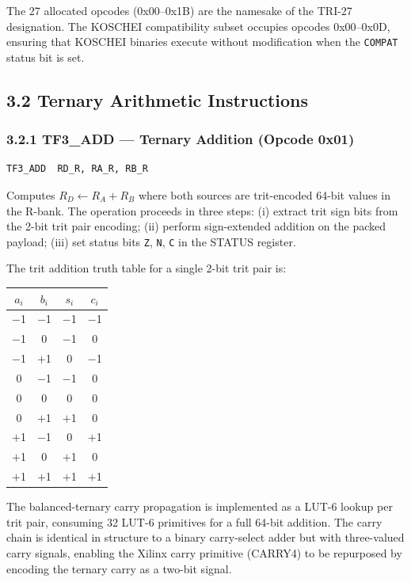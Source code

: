 The 27 allocated opcodes (0x00--0x1B) are the namesake of the
TRI-27 designation. The KOSCHEI compatibility subset occupies
opcodes 0x00--0x0D, ensuring that KOSCHEI binaries execute
without modification when the \texttt{COMPAT} status bit is set.

\subsection{3.2 Ternary Arithmetic Instructions}\label{fa_71:ternary-arithmetic}

\subsubsection{3.2.1 TF3\_ADD --- Ternary Addition (Opcode 0x01)}

\begin{verbatim}
TF3_ADD  RD_R, RA_R, RB_R
\end{verbatim}

Computes \(R_D \leftarrow R_A + R_B\) where both sources are
trit-encoded 64-bit values in the R-bank. The operation proceeds
in three steps: (i) extract trit sign bits from the 2-bit trit
pair encoding; (ii) perform sign-extended addition on the packed
payload; (iii) set status bits \texttt{Z}, \texttt{N}, \texttt{C}
in the STATUS register.

The trit addition truth table for a single 2-bit trit pair is:

\begin{longtable}[]{@{}cccc@{}}
\toprule\noalign{}
\(a_i\) & \(b_i\) & \(s_i\) & \(c_i\) \\
\midrule\noalign{}
\endhead
\bottomrule\noalign{}
\endlastfoot
$-$1 & $-$1 & $-$1 & $-$1 \\
$-$1 & 0 & $-$1 & 0 \\
$-$1 & $+$1 & 0 & $-$1 \\
0 & $-$1 & $-$1 & 0 \\
0 & 0 & 0 & 0 \\
0 & $+$1 & $+$1 & 0 \\
$+$1 & $-$1 & 0 & $+$1 \\
$+$1 & 0 & $+$1 & 0 \\
$+$1 & $+$1 & $+$1 & $+$1 \\
\end{longtable}

The balanced-ternary carry propagation is implemented as a LUT-6
lookup per trit pair, consuming 32 LUT-6 primitives for a full
64-bit addition. The carry chain is identical in structure to a
binary carry-select adder but with three-valued carry signals,
enabling the Xilinx carry primitive (CARRY4) to be repurposed
by encoding the ternary carry as a two-bit signal.

